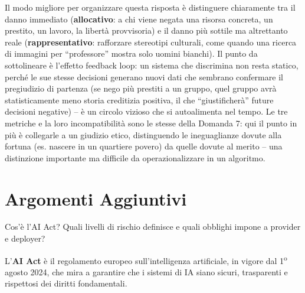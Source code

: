 \documentclass[a4paper,11pt]{article}
\begin{document}
\begin{nota}
Il modo migliore per organizzare questa risposta \`{e} distinguere chiaramente tra il danno immediato (\textbf{allocativo}: a chi viene negata una risorsa concreta, un prestito, un lavoro, la libert\`{a} provvisoria) e il danno pi\`{u} sottile ma altrettanto reale (\textbf{rappresentativo}: rafforzare stereotipi culturali, come quando una ricerca di immagini per ``professore'' mostra solo uomini bianchi). Il punto da sottolineare \`{e} l'effetto feedback loop: un sistema che discrimina non resta statico, perch\'{e} le sue stesse decisioni generano nuovi dati che sembrano confermare il pregiudizio di partenza (se nego pi\`{u} prestiti a un gruppo, quel gruppo avr\`{a} statisticamente meno storia creditizia positiva, il che ``giustificher\`{a}'' future decisioni negative) -- \`{e} un circolo vizioso che si autoalimenta nel tempo. Le tre metriche e la loro incompatibilit\`{a} sono le stesse della Domanda 7: qui il punto in pi\`{u} \`{e} collegarle a un giudizio etico, distinguendo le ineguaglianze dovute alla fortuna (es. nascere in un quartiere povero) da quelle dovute al merito -- una distinzione importante ma difficile da operazionalizzare in un algoritmo.
\end{nota}

\section{Argomenti Aggiuntivi}

\begin{domanda}
Cos'\`{e} l'AI Act? Quali livelli di rischio definisce e quali obblighi impone a provider e deployer?
\end{domanda}

L'\textbf{AI Act} \`{e} il regolamento europeo sull'intelligenza artificiale, in vigore dal 1\textsuperscript{o} agosto 2024, che mira a garantire che i sistemi di IA siano sicuri, trasparenti e rispettosi dei diritti fondamentali.
\end{document}

